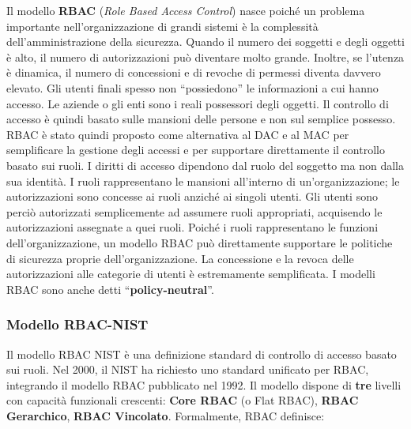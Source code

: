 Il modello \textbf{RBAC} (\textit{Role Based Access Control}) nasce poiché un
problema importante nell'organizzazione di grandi sistemi è la complessità
dell'amministrazione della sicurezza.
Quando il numero dei soggetti e degli oggetti è alto, il numero di autorizzazioni
può diventare molto grande.
Inoltre, se l'utenza è dinamica, il numero di concessioni e di revoche di permessi
diventa davvero elevato. Gli utenti finali spesso non “possiedono” le informazioni
a cui hanno accesso. Le aziende o gli enti sono i reali possessori degli oggetti.
Il controllo di accesso è quindi basato sulle mansioni delle persone e non sul
semplice possesso.
RBAC è stato quindi proposto come alternativa al DAC e al MAC per semplificare
la gestione degli accessi e per supportare direttamente il controllo basato sui
ruoli.
I diritti di accesso dipendono dal ruolo del soggetto ma non dalla sua identità.
I ruoli rappresentano le mansioni all'interno di un'organizzazione;
le autorizzazioni sono concesse ai ruoli anziché ai
singoli utenti. Gli utenti sono perciò autorizzati semplicemente ad assumere ruoli
appropriati, acquisendo le autorizzazioni assegnate a quei ruoli.
Poiché i ruoli rappresentano le funzioni dell'organizzazione, un modello RBAC può
direttamente supportare le politiche di sicurezza proprie dell'organizzazione.
La concessione e la revoca delle
autorizzazioni alle categorie di utenti è estremamente semplificata.
I modelli RBAC sono anche detti “\textbf{policy-neutral}”.

\subsubsection{Modello RBAC-NIST}

Il modello RBAC NIST è una definizione standard di controllo di accesso basato
sui ruoli. Nel 2000, il NIST ha richiesto uno standard unificato per RBAC,
integrando il modello RBAC pubblicato nel 1992.
Il modello dispone di \textbf{tre} livelli con capacità funzionali crescenti:
\textbf{Core RBAC} (o Flat RBAC), \textbf{RBAC Gerarchico}, \textbf{RBAC Vincolato}.
Formalmente, RBAC definisce:

